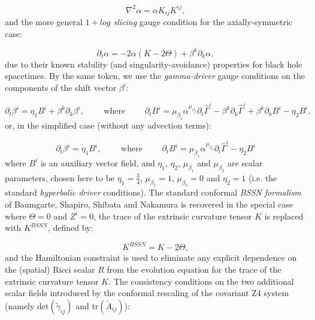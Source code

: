 \documentclass{article}
\begin{document}
\begin{equation}
\nabla^2 \alpha = \alpha K_{i j} K^{i j},
\end{equation}
and the more general \textit{${1 + log}$ slicing} gauge condition\cite{alcubierre3} for the axially-symmetric case:

\begin{equation}
\partial_t \alpha = -2 \alpha \left( K - 2 \Theta \right) + \beta^k \partial_k \alpha,
\end{equation}
due to their known stability (and singularity-avoidance) properties for black hole spacetimes. By the same token, we use the \textit{gamma-driver} gauge conditions\cite{anninos}\cite{smarr} on the components of the shift vector ${\beta^i}$:

\begin{equation}
\partial_t \beta^i = \eta_1 B^i + \beta^k \partial_k \beta^i, \qquad \text{ where } \qquad \partial_t B^i = \mu_{\beta_1} \alpha^{\mu_{\beta_2}} \partial_t \hat{\Gamma}^i - \beta^k \partial_k \hat{\Gamma}^i + \beta^k \partial_k B^i - \eta_2 B^i,
\end{equation}
or, in the simplified case (without any advection terms):

\begin{equation}
\partial_t \beta^i = \eta_1 B^i, \qquad \text{ where } \qquad \partial_t B^i = \mu_{\beta_1} \alpha^{\mu_{\beta_2}} \partial_t \hat{\Gamma}^i - \eta_2 B^i
\end{equation}
where ${B^i}$ is an auxiliary vector field, and ${\eta_1}$, ${\eta_2}$, ${\mu_{\beta_1}}$ and ${\mu_{\beta_2}}$ are scalar parameters, chosen here to be ${\eta_1 = \frac{3}{4}}$, ${\mu_{\beta_1} = 1}$, ${\mu_{\beta_2} = 0}$ and ${\eta_2 = 1}$ (i.e. the standard \textit{hyperbolic driver} conditions). The standard conformal \textit{BSSN formalism} of Baumgarte, Shapiro, Shibata and Nakamura\cite{nakamura} is recovered in the special case where ${\Theta = 0}$ and ${Z^i = 0}$, the trace of the extrinsic curvature tensor $K$ is replaced with ${K^{BSSN}}$, defined by:

\begin{equation}
K^{BSSN} = K - 2 \Theta,
\end{equation}
and the Hamiltonian constraint is used to eliminate any explicit dependence on the (spatial) Ricci scalar $R$ from the evolution equation for the trace of the extrinsic curvature tensor $K$. The consistency conditions on the two additional scalar fields introduced by the conformal rescaling of the covariant Z4 system (namely ${\mathrm{det} \left( \tilde{\gamma}_{i j} \right)}$ and ${\mathrm{tr} \left( \tilde{A}_{i j} \right)}$):
\end{document}
